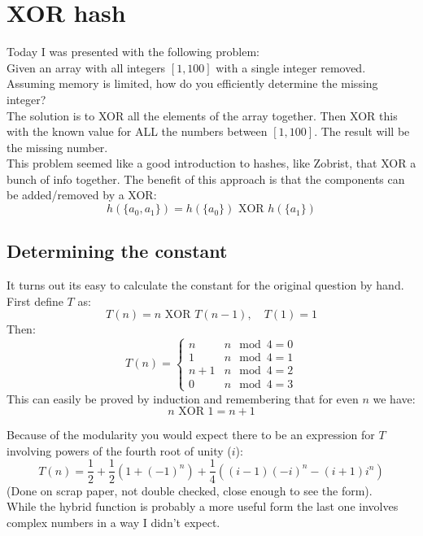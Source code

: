 
\section{XOR hash}
Today I was presented with the following problem:
\\

Given an array with all integers $[1,100]$ with a single integer removed.
Assuming memory is limited, how do you efficiently determine the missing integer?
\\

The solution is to XOR all the elements of the array together.
Then XOR this with the known value for ALL the numbers between $[1,100]$.
The result will be the missing number.
\\

This problem seemed like a good introduction to hashes, like Zobrist, that XOR a bunch of info together.
The benefit of this approach is that the components can be added/removed by a XOR:
\[h(\{a_0,a_1\}) = h(\{a_0\})\text{ XOR }h(\{a_1\})\]

\subsection{Determining the constant}
It turns out its easy to calculate the constant for the original question by hand.
First define $T$ as:
\[T(n) = n \text{ XOR } T(n-1),\quad T(1) = 1\]
Then:
\[T(n) = \begin{cases}n&n \mod 4 = 0 \\1& n\mod 4 = 1\\ n+1 &n\mod 4 = 2\\ 0& n\mod 4 = 3\end{cases}\]
This can easily be proved by induction and remembering that for even $n$ we have:
\[n\text{ XOR } 1 = n+1\]

Because of the modularity you would expect there to be an expression for $T$ involving powers of the fourth root of unity ($i$): 
\[T(n) = \frac{1}{2} +\frac{1}{2}(1+(-1)^n)+\frac{1}{4}((i-1)(-i)^n-(i+1)i^n)\]
(Done on scrap paper, not double checked, close enough to see the form).
\\

While the hybrid function is probably a more useful form the last one involves complex numbers in a way I didn't expect.

